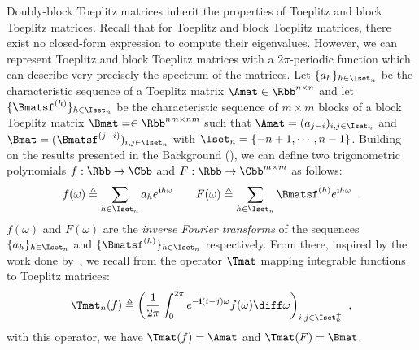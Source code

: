 Doubly-block Toeplitz matrices inherit the properties of Toeplitz and block Toeplitz matrices.
Recall that for Toeplitz and block Toeplitz matrices, there exist no closed-form expression to compute their eigenvalues.
However, we can represent Toeplitz and block Toeplitz matrices with a 2$\pi$-periodic function which can describe very precisely the spectrum of the matrices. 
Let $\{a_h\}_{h \in \Iset_n}$ be the characteristic sequence of a Toeplitz matrix $\Amat \in \Rbb^{n \times n}$ and let $\{\Bmatsf^{(h)}\}_{h \in \Iset_n}$ be the characteristic sequence of $m \times m$ blocks of a block Toeplitz matrix $\Bmat = \in \Rbb^{nm \times nm}$ such that $\Amat = (a_{j-i})_{i,j\in \Iset_n}$ and $\Bmat = (\Bmatsf^{(j-i)})_{i,j \in \Iset_n}$ with $\Iset_n = \left\{ -n+1, \cdots, n-1 \right\}$.
Building on the results presented in the Background (), we can define two trigonometric polynomials $f: \Rbb \rightarrow \Cbb$ and $F: \Rbb \rightarrow \Cbb^{m \times m}$ as follows:
\begin{equation}
  f(\omega) \triangleq \sum_{h \in \Iset_n} a_h e^{\ci h \omega} \quad \quad F(\omega) \triangleq \sum_{h \in \Iset_n} \Bmatsf^{(h)} e^{\ci h \omega} \enspace.
\end{equation}
$f(\omega)$  and $F(\omega)$ are the \emph{inverse Fourier transforms} of the sequences $\{a_h\}_{h \in \Iset_n}$ and $\{\Bmatsf^{(h)}\}_{h \in \Iset_n}$ respectively.
From there, inspired by the work done by~\citet{grenander1958toeplitz}, we recall from  the operator $\Tmat$ mapping integrable functions to Toeplitz matrices:
\begin{equation} \label{equation:expression_toeplitz_matrix}
  \Tmat_n(f) \triangleq\leftmat\frac{1}{2\pi} \int_{0}^{2\pi} e^{-\ci(i-j)\omega} f(\omega) \diff \omega \rightmat_{i,j \in \Iset^+_n} \enspace,
\end{equation}
with this operator, we have $\Tmat(f) = \Amat$ and $\Tmat(F) = \Bmat$.

